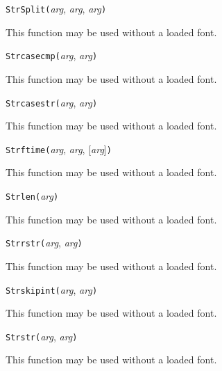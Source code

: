 

\texttt{StrSplit(}\textit{arg}, \textit{arg}, \textit{arg}\texttt{)}

This function may be used without a loaded font.



\texttt{Strcasecmp(}\textit{arg}, \textit{arg}\texttt{)}

This function may be used without a loaded font.



\texttt{Strcasestr(}\textit{arg}, \textit{arg}\texttt{)}

This function may be used without a loaded font.



\texttt{Strftime(}\textit{arg}, \textit{arg}, [\textit{arg}]\texttt{)}

This function may be used without a loaded font.



\texttt{Strlen(}\textit{arg}\texttt{)}

This function may be used without a loaded font.



\texttt{Strrstr(}\textit{arg}, \textit{arg}\texttt{)}

This function may be used without a loaded font.



\texttt{Strskipint(}\textit{arg}, \textit{arg}\texttt{)}

This function may be used without a loaded font.



\texttt{Strstr(}\textit{arg}, \textit{arg}\texttt{)}

This function may be used without a loaded font.

